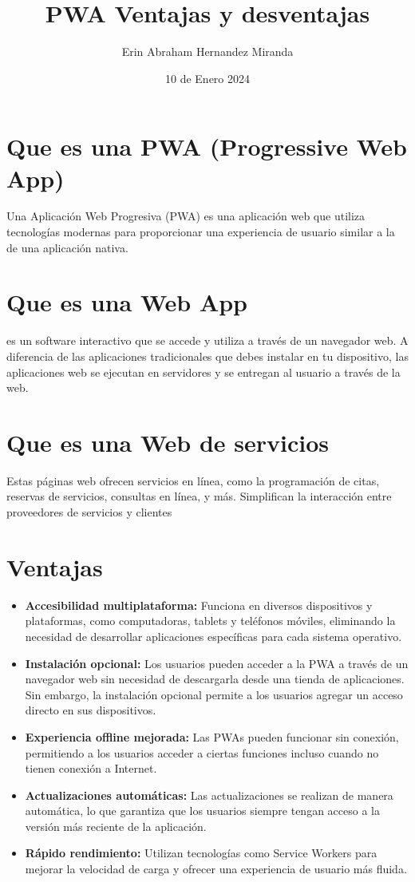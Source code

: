 \documentclass{article}
\title{PWA Ventajas y desventajas}
\author{Erin Abraham Hernandez Miranda}
\date{10 de Enero 2024}
\begin{document}
\maketitle

\newpage

\section*{Que es una PWA (Progressive Web App)}
Una Aplicación Web Progresiva (PWA) es una aplicación web que utiliza tecnologías modernas para proporcionar una experiencia de usuario similar a la de una aplicación nativa. 

\section*{Que es una Web App}
es un software interactivo que se accede y utiliza a través de un navegador web. A diferencia de las aplicaciones tradicionales que debes instalar en tu dispositivo, las aplicaciones web se ejecutan en servidores y se entregan al usuario a través de la web. 

\section*{Que es una Web de servicios}
Estas páginas web ofrecen servicios en línea, como la programación de citas, reservas de servicios, consultas en línea, y más. Simplifican la interacción entre proveedores de servicios y clientes


\newpage

\section*{Ventajas}
\begin{itemize}
    \item \textbf{Accesibilidad multiplataforma:} Funciona en diversos dispositivos y plataformas, como computadoras, tablets y teléfonos móviles, eliminando la necesidad de desarrollar aplicaciones específicas para cada sistema operativo.
    \item \textbf{Instalación opcional:} Los usuarios pueden acceder a la PWA a través de un navegador web sin necesidad de descargarla desde una tienda de aplicaciones. Sin embargo, la instalación opcional permite a los usuarios agregar un acceso directo en sus dispositivos.
    \item \textbf{Experiencia offline mejorada:} Las PWAs pueden funcionar sin conexión, permitiendo a los usuarios acceder a ciertas funciones incluso cuando no tienen conexión a Internet.
    \item \textbf{Actualizaciones automáticas:} Las actualizaciones se realizan de manera automática, lo que garantiza que los usuarios siempre tengan acceso a la versión más reciente de la aplicación.
    \item \textbf{Rápido rendimiento:} Utilizan tecnologías como Service Workers para mejorar la velocidad de carga y ofrecer una experiencia de usuario más fluida.
\end{itemize}
\end{document}
